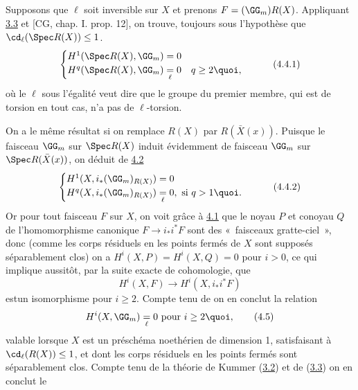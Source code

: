 \documentclass[10pt]{../fichiers-configuration-latex/smfart}
\begin{document}
\subsection{}
Supposons que $\ell$ soit inversible sur $X$ et prenons
$F=(\GG_m) R(X)$. Appliquant \hyperref[IX.thm3.3]{3.3} et [CG,
chap. I. prop. 12], on trouve, toujours sous l'hypothèse que
$\cd_{\ell}(\Spec R(X))\leq 1$.
\begin{equation*}
\begin{cases}
H^1(\Spec R(X), \GG_{m})=0\\
H^q (\Spec R(X), \GG_{m})\; \displaystyle{
\mathop{=}_{\ell} }\; 0\quad q\geq 2{\quoi},
\end{cases}\tag{4.4.1}
\end{equation*}
où le $\ell$ sous l'égalité veut dire que le groupe du premier membre,
qui est de torsion en tout cas, n'a pas de $\ell$-torsion.

On a le même résultat si on remplace $R(X)$ par
$R(\bar{X}(x))$. Puisque le faisceau $\GG_m$ sur
$\Spec R(X)$ induit évidemment de faisceau $\GG_m$ sur
$\Spec R(\bar{X}(x))$, on déduit de \hyperref[IX.cor4.2]{4.2}
\begin{equation*}
\begin{cases}
H^1 (X, i_{\ast}(\GG_m)_{R(X)})=0\\
H^q (X, i_{\ast}(\GG_m)_{R(X)})\;
\displaystyle{\mathop{=}_{\ell}}\; 0,\mbox{ si } q> 1{\quoi}.
\end{cases}\tag{4.4.2}
\end{equation*}
Or pour tout faisceau $F$ sur $X$, on voit grâce à \hyperref[IX.lem4.1]{4.1} que le noyau
$P$ et conoyau $Q$ de l'homomorphisme canonique $F\rightarrow
i_{\ast}i^{\ast}F$ sont des « faisceaux gratte-ciel », donc (comme
les corps résiduels en les points fermés de $X$ sont supposés
séparablement clos) on a $H^{i}(X,P)=H^{i}(X,Q)=0$ pour $i>0$, ce qui
implique aussitôt, par la suite exacte de cohomologie, que
$$
H^{i}(X,F)\longrightarrow H^{i}(X,i_{\ast}i^{\ast}F)
$$
est\pageoriginale un isomorphisme pour $i\geq 2$. Compte tenu de 
on en conclut la relation
\begin{equation*}
H^{i}(X,\GG_m)\displaystyle{\mathop{\;=\;}_{\ell}}0\mbox{
pour } i\geq 2{\quoi},\tag{4.5}
\end{equation*}
valable lorsque $X$ est un préschéma noethérien de dimension 1,
satisfaisant à $\cd_{\ell}(R(X))\leq 1$, et dont les corps résiduels
en les points fermés sont séparablement clos. Compte tenu de la
théorie de Kummer (\hyperref[IX.Thr3.2]{3.2}) et de (\hyperref[IX.thm3.3]{3.3}) on en conclut le
\end{document}
